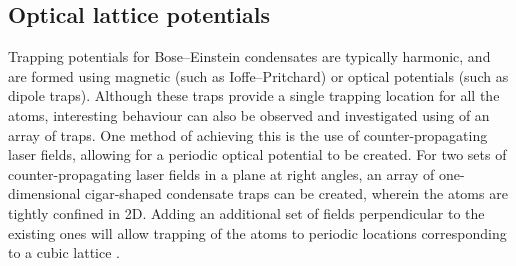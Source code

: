 \subsection{Optical lattice potentials}\label{sub:optlatt}
Trapping potentials for Bose--Einstein condensates are typically harmonic, and are formed using magnetic (such as Ioffe--Pritchard) or optical potentials (such as dipole traps). Although these traps provide a single trapping location for all the atoms, interesting behaviour can also be observed and investigated using of an array of traps. One method of achieving this is the use of counter-propagating laser fields, allowing for a periodic optical potential to be created. For two sets of counter-propagating laser fields in a plane at right angles, an array of one-dimensional cigar-shaped condensate traps can be created, wherein the atoms are tightly confined in 2D. Adding an additional set of fields perpendicular to the existing ones will allow trapping of the atoms to periodic locations corresponding to a cubic lattice \cite[~chap. 2]{BK:LH_2010}. %


